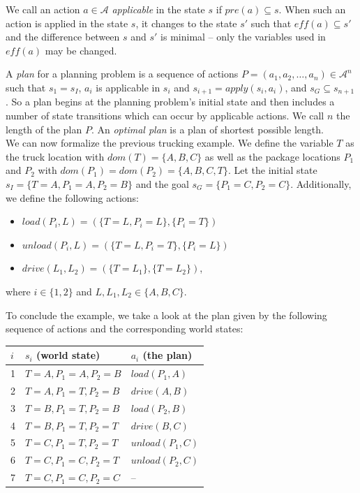 \documentclass{article}
\theoremstyle{definition}
\begin{document}
We call an action $a \in \mathcal{A}$ \emph{applicable} in the state $s$ if $\textit{pre}(a) \subseteq s$. When such an action is applied in the state $s$, it changes to the state $s'$ such that $\textit{eff}(a) \subseteq s'$ and the difference between $s$ and $s'$ is minimal -- only the variables used in $\textit{eff}(a)$ may be changed.

A \emph{plan} for a planning problem is a sequence of actions $P = (a_1, a_2, \ldots, a_n) \in \mathcal{A}^n$ such that $s_1 = s_I$, $a_i$ is applicable in $s_i$ and $s_{i+1} = apply(s_i, a_i)$,  and $s_G \subseteq s_{n+1}$. So a plan begins at the planning problem's initial state and then includes a number of state transitions which can occur by applicable actions. We call $n$ the length of the plan $P$. An \emph{optimal plan} is a plan of shortest possible length.\\

We can now formalize the previous trucking example. We define the variable $T$ as the truck location with $\textit{dom}(T) = \{A, B, C\}$ as well as the package locations $P_1$ and $P_2$ with $\textit{dom}(P_1) = \textit{dom}(P_2) = \{A, B, C, T\}$. Let the initial state $s_I = \{T = A, P_1 = A, P_2 = B\}$ and the goal $s_G = \{P_1 = C, P_2 = C\}$. Additionally, we define the following actions:
\begin{itemize}
\item $\textit{load}(P_i, L) = (\{T = L, P_i = L\}, \{P_i = T\})$
\item $\textit{unload}(P_i, L) = (\{T = L, P_i = T\}, \{P_i = L\})$
\item $\textit{drive}(L_1, L_2) = (\{T = L_1\}, \{T = L_2\})$,
\end{itemize}
where $i \in \{1,2\}$ and $L, L_1, L_2 \in \{A, B, C\}$.

To conclude the example, we take a look at the plan given by the following sequence of actions and the corresponding world states:\\

\begin{tabular}{l|l|l}
$i$ & $s_i$ (world state) & $a_i$ (the plan) \\ \hline
1 & $T = A, P_1 = A, P_2 = B$ & $\textit{load}(P_1, A)$ \\
2 & $T = A, P_1 = T, P_2 = B$ & $\textit{drive}(A, B)$ \\
3 & $T = B, P_1 = T, P_2 = B$ & $\textit{load}(P_2, B)$ \\
4 & $T = B, P_1 = T, P_2 = T$ & $\textit{drive}(B, C)$ \\
5 & $T = C, P_1 = T, P_2 = T$ & $\textit{unload}(P_1, C)$ \\
6 & $T = C, P_1 = C, P_2 = T$ & $\textit{unload}(P_2, C)$ \\
7 & $T = C, P_1 = C, P_2 = C$ & -- \\
\end{tabular} \\
\end{document}

